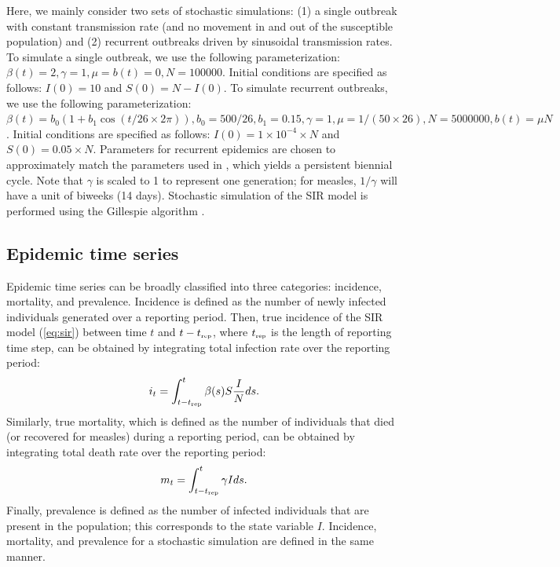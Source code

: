 \documentclass{article}
\newcommand{\eref}[1]{(\ref{eq:#1})}
\newcommand{\tsub}[2]{#1_{{\textrm{\tiny #2}}}}
\begin{document}
Here, we mainly consider two sets of stochastic simulations: (1) a single outbreak with constant transmission rate (and no movement in and out of the susceptible population) and (2) recurrent outbreaks driven by sinusoidal transmission rates.
To simulate a single outbreak, we use the following parameterization: $\beta(t) = 2, \gamma=1, \mu=b(t) = 0, N=100000$.
Initial conditions are specified as follows: $I(0) = 10$ and $S(0) = N - I(0)$.
To simulate recurrent outbreaks, we use the following parameterization: $\beta(t) = b_0 (1 + b_1 \cos (t/26 \times 2\pi)), b_0 = 500/26, b_1 = 0.15, \gamma = 1, \mu=1/(50 \times 26), N=5000000, b(t) = \mu N$. 
Initial conditions are specified as follows: $I(0) = 1 \times 10^{-4} \times N$ and $S(0) = 0.05 \times N$.
Parameters for recurrent epidemics are chosen to approximately match the parameters used in \cite{earn1998persistence}, which yields a persistent biennial cycle.
Note that $\gamma$ is scaled to 1 to represent one generation; for measles, $1/\gamma$ will have a unit of biweeks (14 days).
Stochastic simulation of the SIR model is performed using the Gillespie algorithm \citep{gillespie1976general}.

\subsection{Epidemic time series}

Epidemic time series can be broadly classified into three categories: incidence, mortality, and prevalence.
Incidence is defined as the number of newly infected individuals generated over a reporting period.
Then, true incidence of the SIR model \eref{sir} between time $t$ and $t-\tsub{t}{rep}$, where $\tsub{t}{rep}$ is the length of reporting time step, can be obtained by integrating total infection rate over the reporting period:
\begin{equation}
i_t = \int_{t-\tsub{t}{rep}}^{t} \beta(s) S \frac{I}{N} ds.
\end{equation}
Similarly, true mortality, which is defined as the number of individuals that died (or recovered for measles) during a reporting period, can be obtained by integrating total death rate over the reporting period:
\begin{equation}
m_t = \int_{t-\tsub{t}{rep}}^{t} \gamma I ds.
\end{equation}
Finally, prevalence is defined as the number of infected individuals that are present in the population; 
this corresponds to the state variable $I$. 
Incidence, mortality, and prevalence for a stochastic simulation are defined in the same manner.
\end{document}
